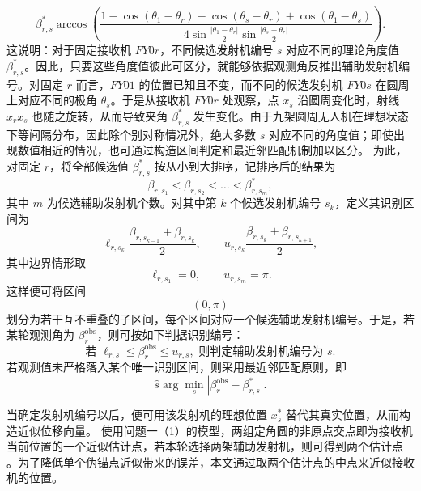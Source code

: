 \documentclass[UTF-8,a4paper,zihao=-4]{ctexart}
\begin{document}
\begin{equation}
\beta_{r,s}^{*}
\arccos \left( \frac{ 1-\cos(\theta_1^{}-\theta_r^{}) -\cos(\theta_s^{}-\theta_r^{}) +\cos(\theta_1^{}-\theta_s^{}) }{ 4\sin\frac{\left|\theta_1^{}-\theta_r^{}\right|}{2} \sin\frac{\left|\theta_s^{}-\theta_r^{}\right|}{2} } \right).
\end{equation}
这说明：对于固定接收机 $FY0r$，不同候选发射机编号 $s$ 对应不同的理论角度值 $\beta_{r,s}^{*}$。因此，只要这些角度值彼此可区分，就能够依据观测角反推出辅助发射机编号。对固定 $r$ 而言，$FY01$ 的位置已知且不变，而不同的候选发射机 $FY0s$ 在圆周上对应不同的极角 $\theta_s^{}$。于是从接收机 $FY0r$ 处观察，点 $x_s^{}$ 沿圆周变化时，射线 $x_r^{}x_s^{}$ 也随之旋转，从而导致夹角 $\beta_{r,s}^{*}$ 发生变化。由于九架圆周无人机在理想状态下等间隔分布，因此除个别对称情况外，绝大多数 $s$ 对应不同的角度值；即使出现数值相近的情况，也可通过构造区间判定和最近邻匹配机制加以区分。
为此，对固定 $r$，将全部候选值 $\beta_{r,s}^{*}$
按从小到大排序，记排序后的结果为
\begin{equation}
\beta_{r,s_1}^{} < \beta_{r,s_2}^{} < \dots < \beta_{r,s_m}^{*},
\end{equation}
其中 $m$ 为候选辅助发射机个数。对其中第 $k$ 个候选发射机编号 $s_k$，定义其识别区间为
\begin{equation}
\ell_{r,s_k}
\frac{\beta_{r,s_{k-1}}^{}+\beta_{r,s_k}^{}}{2}, \qquad u_{r,s_k}
\frac{\beta_{r,s_k}^{}+\beta_{r,s_{k+1}}^{}}{2},
\end{equation}
其中边界情形取
\begin{equation}
\ell_{r,s_1}=0, \qquad u_{r,s_m}=\pi.
\end{equation}
这样便可将区间
$$ (0,\pi) $$
划分为若干互不重叠的子区间，每个区间对应一个候选辅助发射机编号。于是，若某轮观测角为 $\beta_r^{\mathrm{obs}}$，则可按如下判据识别编号：
\begin{equation}
\text{若 } \ell_{r,s}\le \beta_r^{\mathrm{obs}} \le u_{r,s}, \text{ 则判定辅助发射机编号为 } s.
\end{equation}
若观测值未严格落入某个唯一识别区间，则采用最近邻匹配原则，即
\begin{equation}
\hat{s}
\arg\min_{s} \left| \beta_r^{\mathrm{obs}}-\beta_{r,s}^{*} \right|.
\end{equation}

当确定发射机编号以后，便可用该发射机的理想位置 $x_{\hat{s}}^{*}$ 替代其真实位置，从而构造近似位移向量。
使用问题一（1）的模型，两组定角圆的非原点交点即为接收机当前位置的一个近似估计点，若本轮选择两架辅助发射机，则可得到两个估计点 。为了降低单个伪锚点近似带来的误差，本文通过取两个估计点的中点来近似接收机的位置。
\end{document}
